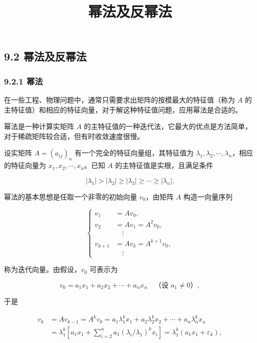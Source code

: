 \documentclass[
  10pt,
  fontset=fandol]{ctexart}
\title{幂法及反幂法}
\author{}
\date{}
\begin{document}
\maketitle

\subsection{9.2 幂法及反幂法}\label{ux5e42ux6cd5ux53caux53cdux5e42ux6cd5}

\subsubsection{9.2.1 幂法}\label{ux5e42ux6cd5}

在一些工程、物理问题中，通常只需要求出矩阵的按模最大的特征值（称为 \(A\) 的主特征值）和相应的特征向量，对于解这种特征值问题，应用幂法是合适的。

幂法是一种计算实矩阵 \(A\) 的主特征值的一种迭代法，它最大的优点是方法简单，对于稀疏矩阵较合适，但有时收敛速度很慢。

设实矩阵 \(A=(a_{ij})_n\) 有一个完全的特征向量组，其特征值为 \(\lambda_1,\lambda_2,\cdots,\lambda_n\)，相应的特征向量为 \(x_1,x_2,\cdots,x_n\)。已知 \(A\) 的主特征值是实根，且满足条件

\[
|\lambda_1|>|\lambda_2|\geq|\lambda_3|\geq\cdots\geq|\lambda_n|.
\tag{9.2.1}
\]

幂法的基本思想是任取一个非零的初始向量 \(v_0\)，由矩阵 \(A\) 构造一向量序列

\[
\left\{
\begin{aligned}
v_1&=Av_0,\\
v_2&=Av_1=A^2v_0,\\
&\quad\vdots\\
v_{k+1}&=Av_k=A^{k+1}v_0,\\
&\quad\vdots
\end{aligned}
\right.
\tag{9.2.2}
\]

称为迭代向量。由假设，\(v_0\) 可表示为

\[
v_0=a_1x_1+a_2x_2+\cdots+a_nx_n\quad\text{（设 }a_1\ne0\text{）},
\tag{9.2.3}
\]

于是

\[
\begin{aligned}
v_k&=Av_{k-1}=A^kv_0=a_1\lambda_1^kx_1+a_2\lambda_2^kx_2+\cdots+a_n\lambda_n^kx_n\\
&=\lambda_1^k\left[a_1x_1+\sum_{i=2}^na_1(\lambda_i/\lambda_1)^kx_i\right]=\lambda_1^k(a_1x_1+\varepsilon_k),
\end{aligned}
\]
\end{document}
